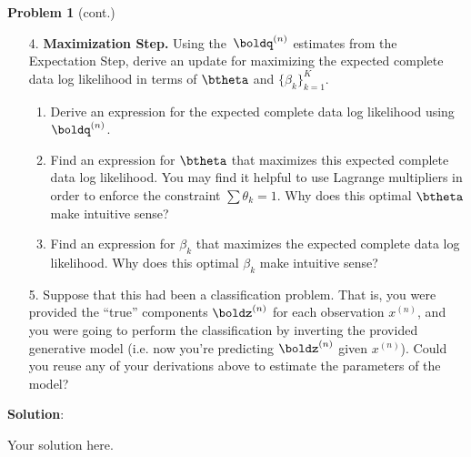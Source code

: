 \documentclass[submit]{../harvardml}
\newenvironment{solution}{
    \vspace{2mm}
    \color{blue}\noindent\textbf{Solution}:
}{}
\begin{document}
\begin{framed}
  \noindent\textbf{Problem 1} (cont.)\\
  \begin{enumerate}
    \item[4.] \textbf{Maximization Step.}
    Using the~$\boldq^{(n)}$ estimates from the Expectation Step, derive an update for maximizing the expected complete data log likelihood in terms of $\btheta$ and $\{ \beta_k \}^K_{k=1}$.

    \begin{enumerate}
      \item Derive an expression for the expected complete data log likelihood using $\boldq^{(n)}$.
      \item Find an expression for $\btheta$ that maximizes this expected complete data log likelihood. You may find it helpful to use Lagrange multipliers in order to enforce the constraint $\sum \theta_k = 1$. Why does this optimal $\btheta$ make intuitive sense?
      \item Find an expression for $\beta_k$ that maximizes the expected complete data log likelihood.  Why does this optimal $\beta_k$  make intuitive sense?
    \end{enumerate}
      
    \item[5.] Suppose that this had been a classification problem. That is,
    you were provided the ``true'' components $\boldz^{(n)}$ for each
    observation $x^{(n)}$,
    and you were going to perform the classification by
    inverting the provided generative model (i.e. now you're predicting $\boldz^{(n)}$ given $x^{(n)}$). Could you reuse any of
    your derivations above to estimate the parameters of the model?
  \end{enumerate}
\end{framed}



\begin{solution}
	Your solution here.
\end{solution}

\newpage
\end{document}

